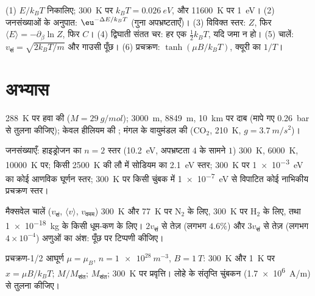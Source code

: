 \begin{method}[बोल्ट्ज़मान आकलन]\label{meth:b2:boltzmann-factor:method}
(1) $E/k_BT$ निकालिए; \qty{300}{K} पर $k_BT = \qty{0.026}{eV}$, और \qty{11600}{K}
पर \qty{1}{eV}। (2) जनसंख्याओं के अनुपात: $\eu^{-\Delta E/k_BT}$ (गुना
अपभ्रष्टताएँ)। (3) विविक्त स्तर: $Z$, फिर $\langle E\rangle =
-\partial_\beta\ln Z$, फिर $C$। (4) द्विघाती संतत चर:
हर एक $\tfrac12k_BT$, यदि जमा न हो। (5) चालें: $v_{\text{सं}} = \sqrt{2k_BT/m}$
और गाउसी पूँछ। (6) प्रचक्रण: $\tanh(\mu B/k_BT)$, क्यूरी का $1/T$।
\end{method}

\section{अभ्यास}

\begin{exercise}[$\star$]\label{exo:b2:boltzmann-factor:1}
\qty{288}{K} पर हवा की  ($M = \qty{29}{g/mol}$); \qty{3000}{m},
\qty{8849}{m}, \qty{10}{km} पर दाब (मापे गए
\qty{0.26}{bar} से तुलना कीजिए); केवल हीलियम की ; मंगल के वायुमंडल की
(CO$_2$, \qty{210}{K}, $g = \qty{3.7}{m/s^2}$)।
\end{exercise}

\begin{exercise}[$\star$]\label{exo:b2:boltzmann-factor:2}
जनसंख्याएँ: हाइड्रोजन का $n = 2$ स्तर (\qty{10.2}{eV}, अपभ्रष्टता $4$
के सामने $1$) \qty{300}{K}, \qty{6000}{K}, \qty{10000}{K} पर; किसी \qty{2500}{K}
की लौ में सोडियम का \qty{2.1}{eV} स्तर; \qty{300}{K} पर
\qty{1e-3}{eV} का कोई आणविक घूर्णन स्तर; \qty{300}{K} पर किसी चुंबक में
\qty{1e-7}{eV} से विपाटित कोई नाभिकीय प्रचक्रण स्तर।
\end{exercise}

\begin{exercise}[$\star$]\label{exo:b2:boltzmann-factor:3}
मैक्सवेल चालें ($v_{\text{सं}}$, $\langle v\rangle$, $v_{\text{वमम}}$) \qty{300}{K} और
\qty{77}{K} पर N$_2$ के लिए, \qty{300}{K} पर H$_2$ के लिए, तथा \qty{1e-18}{kg} के किसी
धूम-कण के लिए।
$2v_{\text{सं}}$ से तेज़ (लगभग $4.6\%$) और $3v_{\text{सं}}$ से तेज़
(लगभग $4 \times 10^{-4}$) अणुओं का अंश: पूँछ पर टिप्पणी कीजिए।
\end{exercise}

\begin{exercise}[$\star$]\label{exo:b2:boltzmann-factor:4}
प्रचक्रण-1/2 आघूर्ण $\mu = \mu_B$, $n = \qty{1e28}{m^{-3}}$, $B = \qty{1}{T}$:
\qty{300}{K} और \qty{1}{K} पर $x = \mu B/k_BT$; $M/M_{\text{संत}}$; $M_{\text{संत}}$;
\qty{300}{K} पर प्रवृत्ति। लोहे के संतृप्ति
चुंबकन (\qty{1.7e6}{A/m}) से तुलना कीजिए।
\end{exercise}

